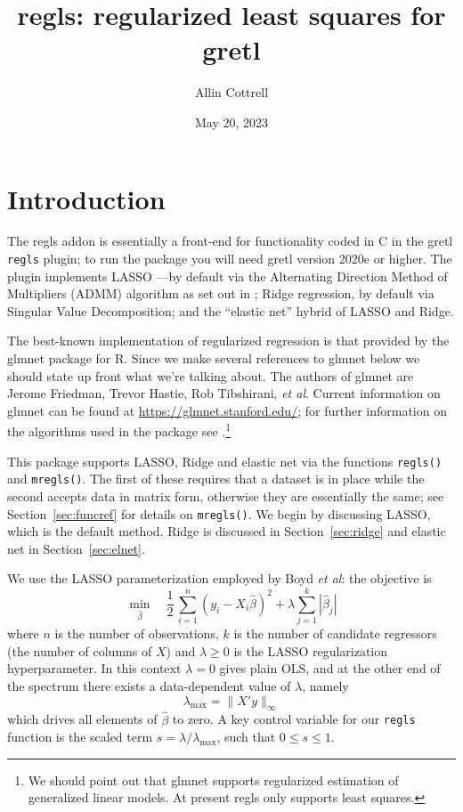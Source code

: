\documentclass{article}
\title{\textsf{regls}: regularized least squares for gretl}
\author{Allin Cottrell}
\date{May 20, 2023}
\begin{document}
\maketitle

\section{Introduction}
\label{sec:intro}

The \textsf{regls} addon is essentially a front-end for functionality
coded in C in the gretl \texttt{regls} plugin; to run the package you
will need gretl version 2020e or higher.  The plugin implements LASSO
\citep{tibshirani96}---by default via the Alternating Direction Method
of Multipliers (ADMM) algorithm as set out in \cite{boyd2010}; Ridge
regression, by default via Singular Value Decomposition; and the
``elastic net'' hybrid of LASSO and Ridge.

The best-known implementation of regularized regression is that
provided by the \textsf{glmnet} package for \textsf{R}. Since we make
several references to \textsf{glmnet} below we should state up front
what we're talking about. The authors of \textsf{glmnet} are Jerome
Friedman, Trevor Hastie, Rob Tibshirani, \textit{et al}.  Current
information on \textsf{glmnet} can be found at
\url{https://glmnet.stanford.edu/}; for further information on the
algorithms used in the package see \cite{glmnet10}.\footnote{We should
  point out that \textsf{glmnet} supports regularized estimation of
  generalized linear models. At present \textsf{regls} only supports
  least squares.}

This package supports LASSO, Ridge and elastic net via the functions
\texttt{regls()} and \texttt{mregls()}. The first of these requires
that a dataset is in place while the second accepts data in matrix
form, otherwise they are essentially the same; see
Section~\ref{sec:funcref} for details on \texttt{mregls()}.  We begin
by discussing LASSO, which is the default method.  Ridge is discussed
in Section~\ref{sec:ridge} and elastic net in Section~\ref{sec:elnet}.

We use the LASSO parameterization employed by Boyd \textit{et al}: the
objective is
\begin{equation}
  \label{eq:obj}
  \min_{\hat{\beta}} \quad \frac{1}{2}\,
  \sum_{i=1}^n (y_i - X_i\hat{\beta})^2 + \lambda \sum_{j=1}^k |\hat{\beta}_j|
\end{equation}
where $n$ is the number of observations, $k$ is the number of
candidate regressors (the number of columns of $X$) and
$\lambda \geq 0$ is the LASSO regularization hyperparameter. In this
context $\lambda = 0$ gives plain OLS, and at the other end of the
spectrum there exists a data-dependent value of $\lambda$, namely
\begin{equation}
  \label{eq:lmax}
  \lambda_{\max} = \|X'y\|_{\infty}
\end{equation}
which drives all elements of $\hat{\beta}$ to zero.  A key control
variable for our \texttt{regls} function is the scaled term
$s = \lambda/\lambda_{\max}$, such that $0 \leq s \leq 1$.
\end{document}
